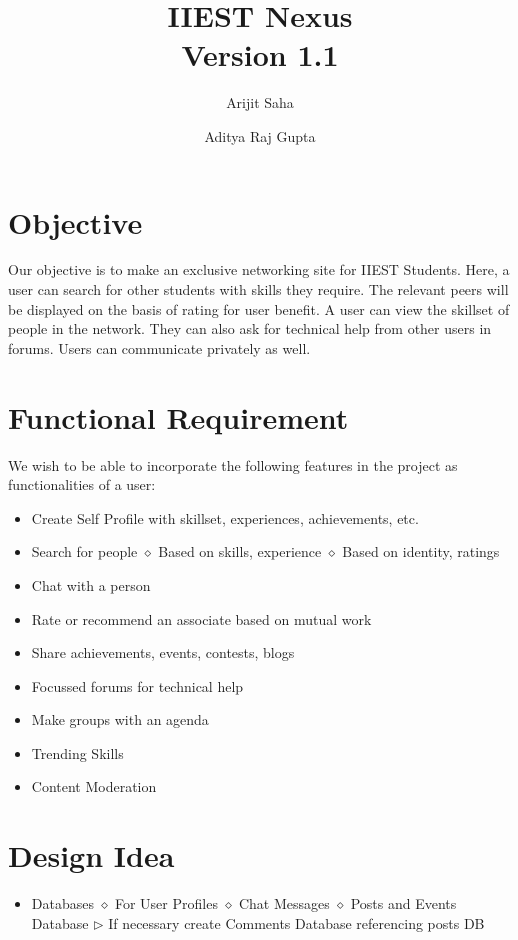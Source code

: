 \documentclass[a4paper,12pt]{article}
\begin{document}
\title{IIEST Nexus\\
\small Version 1.1}
\author{Arijit Saha\and
Aditya Raj Gupta}
\maketitle
\section{Objective}
Our objective is to make an exclusive networking site for IIEST Students. Here, a user can search for other students with skills they require. The relevant peers will be displayed on the basis of rating for user benefit. A user can view the skillset of people in the network. They can also ask for technical help from other users in forums. Users can communicate privately as well.



\section{Functional Requirement}
We wish to be able to incorporate the following features in the project as functionalities of a user:
\begin{itemize}
\item Create Self Profile with skillset, experiences, achievements, etc.
\item Search for people
	\subitem $\diamond$ Based on skills, experience
	\subitem $\diamond$ Based on identity, ratings
\item Chat with a person
\item Rate or recommend an associate based on mutual work
\item Share achievements, events, contests, blogs
\item Focussed forums for technical help
\item Make groups with an agenda
\item Trending Skills
\item Content Moderation
\end{itemize}


\section{Design Idea}
\begin{itemize}
\item Databases
	\subitem $\diamond$ For User Profiles
	\subitem $\diamond$ Chat Messages
	\subitem $\diamond$ Posts and Events Database
		\subsubitem $\triangleright$ If necessary create Comments Database referencing posts DB
\end{itemize}
\end{document}
